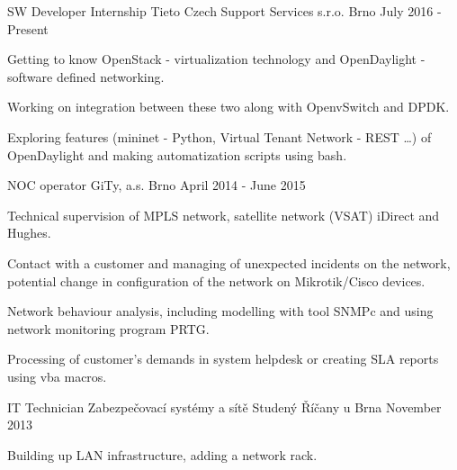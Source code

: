 
\begin{cventries}

  \cventry
    {SW Developer Internship}
    {Tieto Czech Support Services s.r.o.}
    {Brno}
    {July 2016 - Present}
    {
      \begin{cvitems}
       \item {Getting to know OpenStack - virtualization technology and OpenDaylight - software defined networking.}
       \item {Working on integration between these two along with OpenvSwitch and DPDK.}
       \item {Exploring features (mininet - Python, Virtual Tenant Network - REST \dots) of OpenDaylight and making automatization scripts using bash.}
      \end{cvitems}
    }

  \cventry
    {NOC operator} %
    {GiTy, a.s.} %
    {Brno} %
    {April 2014 - June 2015} %
    {
      \begin{cvitems} %
	\item {Technical supervision of MPLS network, satellite network (VSAT) iDirect and Hughes.}
        \item {Contact with a customer and managing of unexpected incidents on the network, potential change in configuration of the network on Mikrotik/Cisco devices.}     
        \item {Network behaviour analysis, including modelling with tool SNMPc and using network monitoring program PRTG.}     
        \item {Processing of customer's demands in system helpdesk or creating SLA reports using vba macros.}        
      \end{cvitems}
    }

   \cventry
   {IT Technician}
   {Zabezpečovací systémy a sítě Studený}
   {Říčany u Brna}
   {November 2013}
   {
    \begin{cvitems}
      \item {Building up LAN infrastructure, adding a network rack.}
    \end{cvitems}
   }


\end{cventries}
